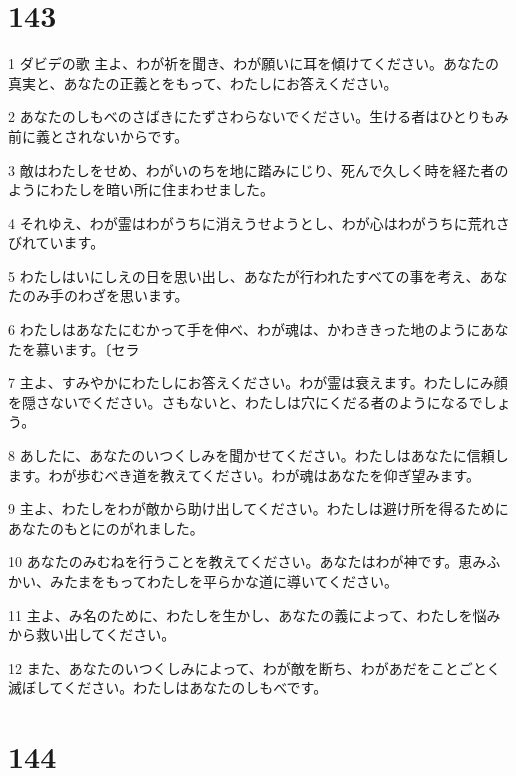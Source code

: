 \chapter{143}

\par 1 ダビデの歌 主よ、わが祈を聞き、わが願いに耳を傾けてください。あなたの真実と、あなたの正義とをもって、わたしにお答えください。
\par 2 あなたのしもべのさばきにたずさわらないでください。生ける者はひとりもみ前に義とされないからです。
\par 3 敵はわたしをせめ、わがいのちを地に踏みにじり、死んで久しく時を経た者のようにわたしを暗い所に住まわせました。
\par 4 それゆえ、わが霊はわがうちに消えうせようとし、わが心はわがうちに荒れさびれています。
\par 5 わたしはいにしえの日を思い出し、あなたが行われたすべての事を考え、あなたのみ手のわざを思います。
\par 6 わたしはあなたにむかって手を伸べ、わが魂は、かわききった地のようにあなたを慕います。〔セラ
\par 7 主よ、すみやかにわたしにお答えください。わが霊は衰えます。わたしにみ顔を隠さないでください。さもないと、わたしは穴にくだる者のようになるでしょう。
\par 8 あしたに、あなたのいつくしみを聞かせてください。わたしはあなたに信頼します。わが歩むべき道を教えてください。わが魂はあなたを仰ぎ望みます。
\par 9 主よ、わたしをわが敵から助け出してください。わたしは避け所を得るためにあなたのもとにのがれました。
\par 10 あなたのみむねを行うことを教えてください。あなたはわが神です。恵みふかい、みたまをもってわたしを平らかな道に導いてください。
\par 11 主よ、み名のために、わたしを生かし、あなたの義によって、わたしを悩みから救い出してください。
\par 12 また、あなたのいつくしみによって、わが敵を断ち、わがあだをことごとく滅ぼしてください。わたしはあなたのしもべです。

\chapter{144}

